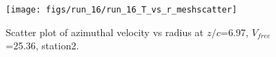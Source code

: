 \begin{figure}[H]
\centering
\texttt{[image: figs/run\_16/run\_16\_T\_vs\_r\_meshscatter]}
\caption{Scatter plot of azimuthal velocity vs radius at $z/c$=6.97, $V_{free}$=25.36, station2.}
\label{fig:run_16_T_vs_r_meshscatter}
\end{figure}



